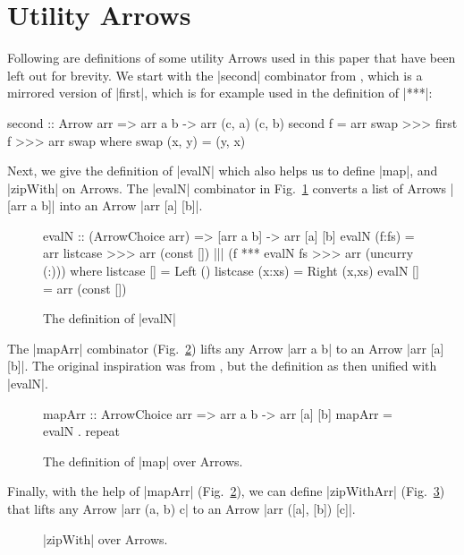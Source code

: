 \section{Utility Arrows}\label{utilfns}
Following are definitions of some utility Arrows used in this paper that have been left out for brevity.
We start with the |second| combinator from \citet{HughesArrows}, which is a mirrored version of |first|, which is for example used in the definition of |***|: 
\begin{code}
second :: Arrow arr => arr a b -> arr (c, a) (c, b)
second f = arr swap >>> first f >>> arr swap
	where swap (x, y) = (y, x)
\end{code}

Next, we give the definition of |evalN| which also helps us to define |map|, and |zipWith| on Arrows.
The |evalN| combinator in Fig.~\ref{fig:evalN} converts a list of Arrows |[arr a b]| into an Arrow |arr [a] [b]|.

\begin{figure}[h]
\begin{code}
evalN :: (ArrowChoice arr) => [arr a b] -> arr [a] [b]
evalN (f:fs) = arr listcase >>>
         arr (const []) ||| (f *** evalN fs >>> arr (uncurry (:)))
         where listcase []     = Left ()
               listcase (x:xs) = Right (x,xs)
evalN [] = arr (const [])
\end{code}
\caption{The definition of |evalN|}
\label{fig:evalN}
\end{figure}

The |mapArr| combinator (Fig.~\ref{fig:mapArr}) lifts any Arrow |arr a
b| to an Arrow |arr [a] [b]|. The original inspiration was from \citet{Hughes2005},
but the definition as then unified with |evalN|. 

\begin{figure}[h]
\begin{code}
mapArr :: ArrowChoice arr => arr a b -> arr [a] [b]
mapArr = evalN . repeat
\end{code}
\caption{The definition of |map| over Arrows.}
\label{fig:mapArr}
\end{figure}

Finally, with the help of |mapArr| (Fig.~\ref{fig:mapArr}), we can define |zipWithArr|  (Fig.~\ref{fig:zipWithArr}) that lifts any Arrow |arr (a, b) c| to an Arrow |arr ([a], [b]) [c]|.
\begin{figure}[h]
\caption{|zipWith| over Arrows.} %
\label{fig:zipWithArr}
\end{figure}


